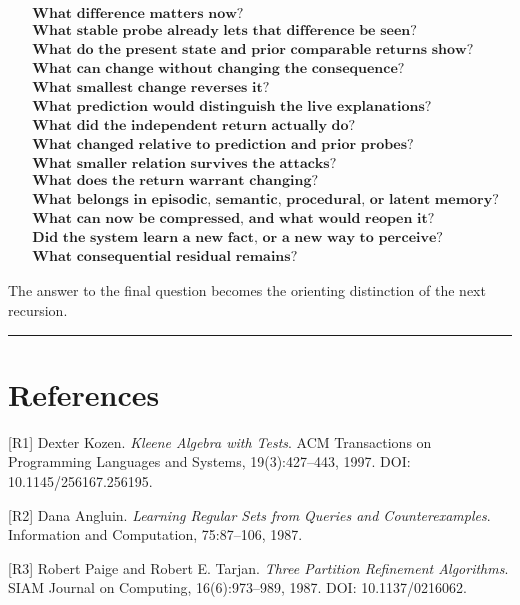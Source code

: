 \documentclass[
]{article}
\begin{document}
\[
\boxed{
\begin{aligned}
&\textbf{What difference matters now?}\\
&\textbf{What stable probe already lets that difference be seen?}\\
&\textbf{What do the present state and prior comparable returns show?}\\
&\textbf{What can change without changing the consequence?}\\
&\textbf{What smallest change reverses it?}\\
&\textbf{What prediction would distinguish the live explanations?}\\
&\textbf{What did the independent return actually do?}\\
&\textbf{What changed relative to prediction and prior probes?}\\
&\textbf{What smaller relation survives the attacks?}\\
&\textbf{What does the return warrant changing?}\\
&\textbf{What belongs in episodic, semantic, procedural, or latent memory?}\\
&\textbf{What can now be compressed, and what would reopen it?}\\
&\textbf{Did the system learn a new fact, or a new way to perceive?}\\
&\textbf{What consequential residual remains?}
\end{aligned}
}
\]

The answer to the final question becomes the orienting distinction of the next
recursion.

\begin{center}\rule{0.5\linewidth}{0.5pt}\end{center}

\section{References}\label{references}

{[}R1{]} Dexter Kozen. \emph{Kleene Algebra with Tests}. ACM
Transactions on Programming Languages and Systems, 19(3):427--443, 1997.
DOI: 10.1145/256167.256195.

{[}R2{]} Dana Angluin. \emph{Learning Regular Sets from Queries and
Counterexamples}. Information and Computation, 75:87--106, 1987.

{[}R3{]} Robert Paige and Robert E. Tarjan. \emph{Three Partition
Refinement Algorithms}. SIAM Journal on Computing, 16(6):973--989, 1987.
DOI: 10.1137/0216062.
\end{document}
